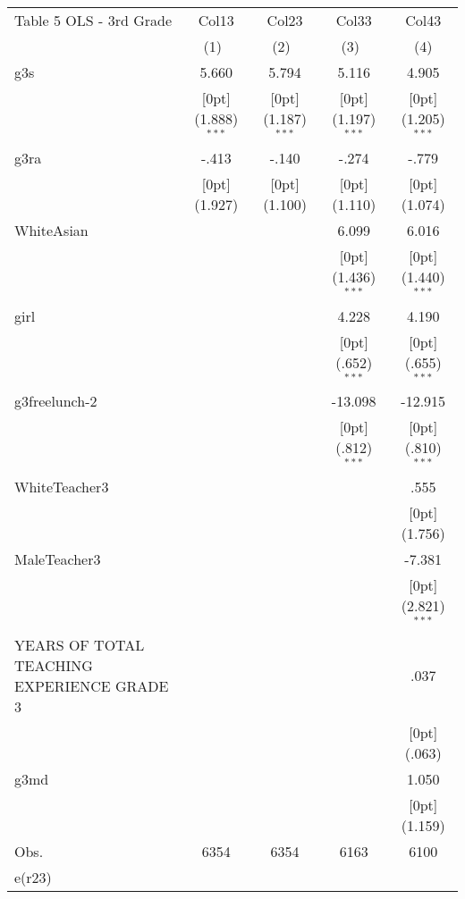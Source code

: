 \documentclass[a4paper,11pt]{article}
\begin{document}
\begin{table}
	\small
\begin{tabular*}{\textwidth}{@{\extracolsep{\fill}}lcccc}				
	Table 5 OLS - 3rd Grade & \multicolumn{1}{c}{Col13} &	\multicolumn{1}{c}{Col23} &	\multicolumn{1}{c}{Col33} &	\multicolumn{1}{c}{Col43} \\
	\cline{2-5}				
	& \multicolumn{1}{c}{(1)\mbox{\ }} &	\multicolumn{1}{c}{(2)\mbox{\ }} &	\multicolumn{1}{c}{(3)\mbox{\ }} &	\multicolumn{1}{c}{(4)} \\
	\hline				
	g3s &	5.660 &	5.794 &	5.116 &	4.905 \\
	&	\raisebox{.7ex}[0pt]{\scriptsize (1.888)$^{***}$} &	\raisebox{.7ex}[0pt]{\scriptsize (1.187)$^{***}$} &	\raisebox{.7ex}[0pt]{\scriptsize (1.197)$^{***}$} &	\raisebox{.7ex}[0pt]{\scriptsize (1.205)$^{***}$} \\
	g3ra &	-.413 &	-.140 &	-.274 &	-.779 \\
	&	\raisebox{.7ex}[0pt]{\scriptsize (1.927)} &	\raisebox{.7ex}[0pt]{\scriptsize (1.100)} &	\raisebox{.7ex}[0pt]{\scriptsize (1.110)} &	\raisebox{.7ex}[0pt]{\scriptsize (1.074)} \\
	WhiteAsian &	&	&	6.099 &	6.016 \\
	&	&	&	\raisebox{.7ex}[0pt]{\scriptsize (1.436)$^{***}$} &	\raisebox{.7ex}[0pt]{\scriptsize (1.440)$^{***}$} \\
	girl &	&	&	4.228 &	4.190 \\
	&	&	&	\raisebox{.7ex}[0pt]{\scriptsize (.652)$^{***}$} &	\raisebox{.7ex}[0pt]{\scriptsize (.655)$^{***}$} \\
	g3freelunch-2 &	&	&	-13.098 &	-12.915 \\
	&	&	&	\raisebox{.7ex}[0pt]{\scriptsize (.812)$^{***}$} &	\raisebox{.7ex}[0pt]{\scriptsize (.810)$^{***}$} \\
	WhiteTeacher3 &	&	&	&	.555 \\
	&	&	&	&	\raisebox{.7ex}[0pt]{\scriptsize (1.756)} \\
	MaleTeacher3 &	&	&	&	-7.381 \\
	&	&	&	&	\raisebox{.7ex}[0pt]{\scriptsize (2.821)$^{***}$} \\
	YEARS OF TOTAL TEACHING EXPERIENCE GRADE 3 &	&	&	&	.037 \\
	&	&	&	&	\raisebox{.7ex}[0pt]{\scriptsize (.063)} \\
	g3md &	&	&	&	1.050 \\
	&	&	&	&	\raisebox{.7ex}[0pt]{\scriptsize (1.159)} \\
	Obs. &	6354 &	6354 &	6163 &	6100 \\
	e(r23) &	&	&	&	\\
	\hline\hline				
\end{tabular*}
\end{table}	
\end{document}
